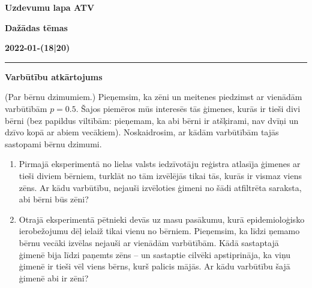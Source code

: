 \documentclass[a4paper,12pt]{article}
\begin{document}
\clearpage
\begin{center}
\parbox{3.5cm}{\flushleft\bf Uzdevumu lapa \newline ATV} \hfill {\bf\LARGE Dažādas tēmas} \hfill \parbox{3.5cm}{\flushright\bf 2022-01-(18|20)} %
\end{center}

\hrule

\vspace{20pt}
{\Large \bf Varbūtību atkārtojums}


\vspace{10pt}
\begin{problem}
(Par bērnu dzimumiem.) Pieņemsim, ka zēni un meitenes piedzimst ar vienādām varbūtībām $p=0.5$. 
Šajos piemēros mūs interesēs tās ģimenes, kurās ir tieši divi bērni (bez papildus viltībām: 
pieņemam, ka abi bērni ir atšķirami, nav dvīņi un dzīvo kopā ar abiem vecākiem).
Noskaidrosim, ar kādām varbūtībām tajās sastopami bērnu dzimumi. 
\begin{enumerate}
\item Pirmajā eksperimentā no lielas valsts iedzīvotāju reģistra atlasīja ģimenes ar
tieši diviem bērniem, turklāt no tām izvēlējās tikai tās, kurās ir vismaz viens zēns.
Ar kādu varbūtību, nejauši izvēloties ģimeni no šādi atfiltrēta saraksta, abi bērni būs zēni?
\item Otrajā eksperimentā pētnieki devās uz masu pasākumu, kurā epidemioloģisko 
ierobežojumu dēļ ielaiž tikai vienu no bērniem.
Pieņemsim, ka līdzi ņemamo bērnu vecāki izvēlas nejauši ar vienādām varbūtībām.
Kādā sastaptajā ģimenē bija līdzi paņemts zēns -- un sastaptie cilvēki apstiprināja, 
ka viņu ģimenē ir tieši vēl viens bērns, kurš palicis mājās.
Ar kādu varbūtību šajā ģimenē abi ir zēni? 
\end{enumerate}
\end{problem}
\end{document}
